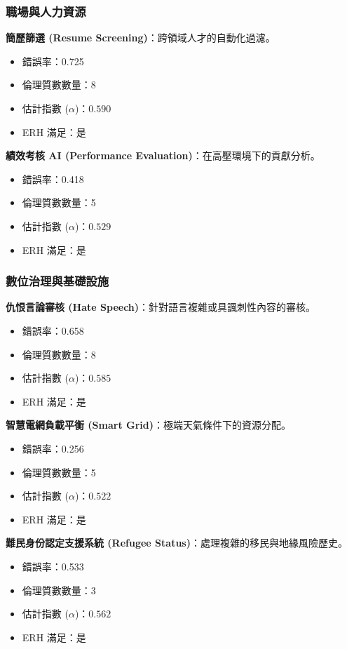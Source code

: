 \documentclass[12pt,a4paper]{article}
\theoremstyle{definition}
\theoremstyle{remark}
\begin{document}
\subsubsection{職場與人力資源}

\textbf{簡歷篩選 (Resume Screening)}：跨領域人才的自動化過濾。
\begin{itemize}
    \item 錯誤率：0.725
    \item 倫理質數數量：8
    \item 估計指數 ($\alpha$)：$0.590$
    \item ERH 滿足：是
\end{itemize}

\textbf{績效考核 AI (Performance Evaluation)}：在高壓環境下的貢獻分析。
\begin{itemize}
    \item 錯誤率：0.418
    \item 倫理質數數量：5
    \item 估計指數 ($\alpha$)：$0.529$
    \item ERH 滿足：是
\end{itemize}

\subsubsection{數位治理與基礎設施}

\textbf{仇恨言論審核 (Hate Speech)}：針對語言複雜或具諷刺性內容的審核。
\begin{itemize}
    \item 錯誤率：0.658
    \item 倫理質數數量：8
    \item 估計指數 ($\alpha$)：$0.585$
    \item ERH 滿足：是
\end{itemize}

\textbf{智慧電網負載平衡 (Smart Grid)}：極端天氣條件下的資源分配。
\begin{itemize}
    \item 錯誤率：0.256
    \item 倫理質數數量：5
    \item 估計指數 ($\alpha$)：$0.522$
    \item ERH 滿足：是
\end{itemize}

\textbf{難民身份認定支援系統 (Refugee Status)}：處理複雜的移民與地緣風險歷史。
\begin{itemize}
    \item 錯誤率：0.533
    \item 倫理質數數量：3
    \item 估計指數 ($\alpha$)：$0.562$
    \item ERH 滿足：是
\end{itemize}
\end{document}
